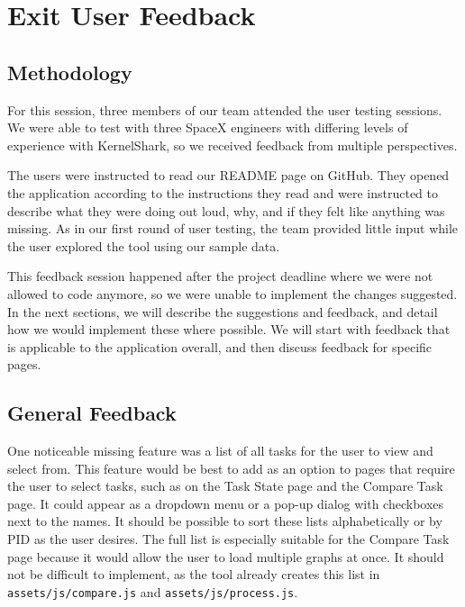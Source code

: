 \documentclass{hmcclinic}
\begin{document}
\chapter{Exit User Feedback}
\section{Methodology}
   For this session, three members of our team attended the user testing sessions.
   We were able to test with three SpaceX engineers with differing levels of
   experience with KernelShark, so we received feedback from multiple perspectives.

   The users were instructed to read our README page on GitHub. They
   opened the application according to the instructions they read and were
   instructed to describe what they were doing out loud, why, and if they felt
   like anything was missing. As in our first round of user testing, the team
   provided little input while the user explored the tool using our sample data.

   This feedback session happened after the project deadline where we were not allowed to code anymore, so we were unable to
   implement the changes suggested. In the next sections, we will describe the
   suggestions and feedback, and detail how we would implement these where
   possible. We will start with feedback that is applicable to the application
   overall, and then discuss feedback for specific pages.

\section{General Feedback}

One noticeable missing feature was a list of all tasks for the user to view and select from. 
This feature would be best to add as an option to pages that require the user to select tasks, such 
as on the Task State page and the Compare Task page. It could appear as a dropdown menu or a 
pop-up dialog with checkboxes next to the names. It should be possible to sort these lists 
alphabetically or by PID as the user desires. The full list is especially suitable for the 
Compare Task page because it would allow the user to load multiple graphs at once. It should 
not be difficult to implement, as the tool already creates this list in 
\texttt{assets/js/compare.js} and \texttt{assets/js/process.js}.
\end{document}
